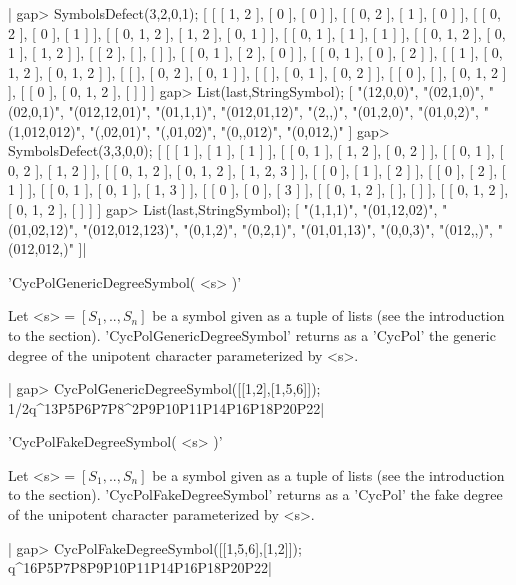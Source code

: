 |    gap> SymbolsDefect(3,2,0,1);
    [ [ [ 1, 2 ], [ 0 ], [ 0 ] ], [ [ 0, 2 ], [ 1 ], [ 0 ] ],
      [ [ 0, 2 ], [ 0 ], [ 1 ] ], [ [ 0, 1, 2 ], [ 1, 2 ], [ 0, 1 ] ],
      [ [ 0, 1 ], [ 1 ], [ 1 ] ], [ [ 0, 1, 2 ], [ 0, 1 ], [ 1, 2 ] ],
      [ [ 2 ], [  ], [  ] ], [ [ 0, 1 ], [ 2 ], [ 0 ] ],
      [ [ 0, 1 ], [ 0 ], [ 2 ] ], [ [ 1 ], [ 0, 1, 2 ], [ 0, 1, 2 ] ],
      [ [  ], [ 0, 2 ], [ 0, 1 ] ], [ [  ], [ 0, 1 ], [ 0, 2 ] ],
      [ [ 0 ], [  ], [ 0, 1, 2 ] ], [ [ 0 ], [ 0, 1, 2 ], [  ] ] ]
    gap> List(last,StringSymbol);
    [ "(12,0,0)", "(02,1,0)", "(02,0,1)", "(012,12,01)", "(01,1,1)",
      "(012,01,12)", "(2,,)", "(01,2,0)", "(01,0,2)", "(1,012,012)", 
      "(,02,01)", "(,01,02)", "(0,,012)", "(0,012,)" ]
    gap> SymbolsDefect(3,3,0,0);
    [ [ [ 1 ], [ 1 ], [ 1 ] ], [ [ 0, 1 ], [ 1, 2 ], [ 0, 2 ] ],
      [ [ 0, 1 ], [ 0, 2 ], [ 1, 2 ] ], 
      [ [ 0, 1, 2 ], [ 0, 1, 2 ], [ 1, 2, 3 ] ], [ [ 0 ], [ 1 ], [ 2 ] ], 
      [ [ 0 ], [ 2 ], [ 1 ] ], [ [ 0, 1 ], [ 0, 1 ], [ 1, 3 ] ], 
      [ [ 0 ], [ 0 ], [ 3 ] ], [ [ 0, 1, 2 ], [  ], [  ] ], 
      [ [ 0, 1, 2 ], [ 0, 1, 2 ], [  ] ] ]
    gap> List(last,StringSymbol);
    [ "(1,1,1)", "(01,12,02)", "(01,02,12)", "(012,012,123)", "(0,1,2)",
      "(0,2,1)", "(01,01,13)", "(0,0,3)", "(012,,)", "(012,012,)" ]|

%
%

'CycPolGenericDegreeSymbol( <s> )'

Let <s>$=[S_1,..,S_n]$  be a symbol given  as a tuple of  lists (see the
introduction to  the section). 'CycPolGenericDegreeSymbol' returns  as a
'CycPol' the generic degree of  the unipotent character parameterized by
<s>.

|    gap> CycPolGenericDegreeSymbol([[1,2],[1,5,6]]);
     1/2q^13P5P6P7P8^2P9P10P11P14P16P18P20P22|

%
%

'CycPolFakeDegreeSymbol( <s> )'

Let <s>$=[S_1,..,S_n]$  be a symbol given  as a tuple of  lists (see the
introduction  to the  section).  'CycPolFakeDegreeSymbol'  returns as  a
'CycPol' the  fake degree  of the  unipotent character  parameterized by
<s>.

|    gap> CycPolFakeDegreeSymbol([[1,5,6],[1,2]]);
      q^16P5P7P8P9P10P11P14P16P18P20P22|

